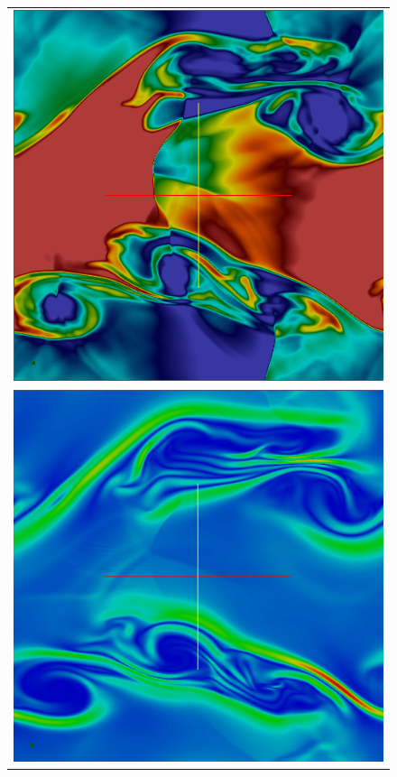 \begin{figure}[htbp]\figSpace
\begin{center} 
\begin{tabular}{c}
\includegraphics[width=0.4\textheight]{fig/kh_mhd_d_0200.png} \\ 
\includegraphics[width=0.4\textheight]{fig/kh_mhd_bmag_0200.png} 

\end{tabular}
\end{center}
\end{figure}
